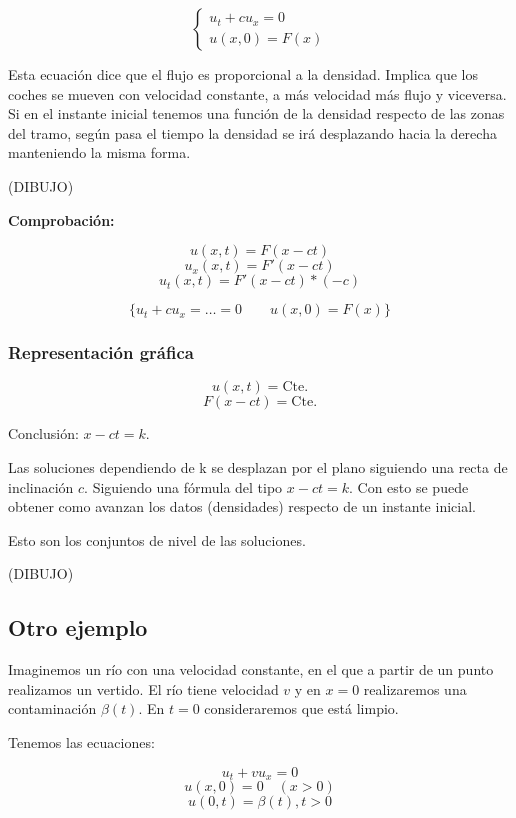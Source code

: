 		\begin{equation*}
		\left\{
		\begin{array}{l}
		u_t + cu_x = 0 \\
		u(x,0) = F(x)
		\end{array}
		\right.
		\end{equation*}


		Esta ecuación dice que el flujo es proporcional a la densidad. Implica que los coches se mueven con velocidad constante, a más velocidad más flujo y viceversa. Si en el instante inicial tenemos una función de la densidad respecto de las zonas del tramo, según pasa el tiempo la densidad se irá desplazando hacia la derecha manteniendo la misma forma.

		(DIBUJO)

		\textbf{Comprobación:}

		$$ u(x,t) = F(x-ct) $$
		$$ u_x(x,t) = F'(x-ct)$$
		$$u_t(x,t) = F'(x-ct)*(-c)$$

		$$ \{ u_t + cu_x = … = 0 \quad\quad u(x,0) = F(x) \} $$

		\subsubsection{Representación gráfica}


			$$u(x,t) = \text{Cte.}$$
			$$F(x - ct) = \text{Cte.}$$

			Conclusión: $x-ct = k$.


			Las soluciones dependiendo de k se desplazan por el plano siguiendo una recta de inclinación $c$. Siguiendo una fórmula del tipo $x-ct = k$. Con esto se puede obtener como avanzan los datos (densidades) respecto de un instante inicial.

			Esto son los conjuntos de nivel de las soluciones.

			(DIBUJO)



	\subsection{Otro ejemplo}

		Imaginemos un río con una velocidad constante, en el que a partir de un punto realizamos un vertido. El río tiene velocidad $v$ y en $x=0$ realizaremos una contaminación $\beta(t)$. En $t=0$ consideraremos que está limpio.

		Tenemos las ecuaciones:

		$$u_t + vu_x = 0$$
		$$u(x,0) = 0 \quad (x>0) $$
		$$u(0,t) = \beta(t), t>0$$


